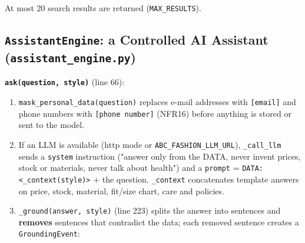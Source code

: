 At most 20 search results are returned (\texttt{MAX\_\allowbreak{}RESULTS}).

\hypertarget{assistantengine-a-controlled-ai-assistant-assistant_engine.py}{%
\subsection{\texorpdfstring{\texttt{AssistantEngine}: a Controlled AI
Assistant
(\texttt{assistant\_\allowbreak{}engine.\allowbreak{}py})}{AssistantEngine: a Controlled AI Assistant (assistant\_engine.py)}}\label{assistantengine-a-controlled-ai-assistant-assistant_engine.py}}

\textbf{\texttt{ask(\allowbreak{}question,\allowbreak{} style)}} (line 66):

\begin{enumerate}
\def\labelenumi{\arabic{enumi}.}
\tightlist
\item
  \texttt{mask\_\allowbreak{}personal\_\allowbreak{}data(\allowbreak{}question)} replaces e-mail addresses with
  \texttt{{[}email{]}} and phone numbers with
  \texttt{{[}phone number{]}} (NFR16) before anything is stored or sent
  to the model.
\item
  If an LLM is available (http mode or \texttt{ABC\_\allowbreak{}FASHION\_\allowbreak{}LLM\_\allowbreak{}URL}),
  \texttt{\_\allowbreak{}call\_\allowbreak{}llm} sends a \texttt{system} instruction ("answer only
  from the DATA, never invent prices, stock or materials, never talk
  about health") and a \texttt{prompt} =
  \texttt{DATA: \textless{}\_\allowbreak{}context(\allowbreak{}style)\textgreater{}\allowbreak{}} + the
  question. \texttt{\_\allowbreak{}context} concatenates template answers on price,
  stock, material, fit/size chart, care and policies.
\item
  \texttt{\_\allowbreak{}ground(\allowbreak{}answer,\allowbreak{} style)} (line 223) splits the answer into
  sentences and \textbf{removes} sentences that contradict the data;
  each removed sentence creates a \texttt{GroundingEvent}:
\end{enumerate}

